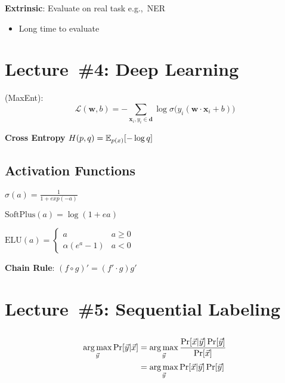 \documentclass[9pt]{extarticle}
\renewcommand{\green}[1]{{\color{ForestGreen} #1}}
\begin{document}
\begin{multicols}{3}
  \textbf{\green{Extrinsic}}: Evaluate on real task e.g.,~NER
  \begin{itemize}
    \item Long time to evaluate
  \end{itemize}

  \section*{Lecture~\#4: Deep Learning}
  \textbf{} (MaxEnt):
  \begin{equation*}\label{eq:L04:LogReg}
    \mathcal{L}(\mathbf{w},b) = -\sum_{\mathbf{x}_i,y_i \in \mathbf{d}} \log \sigma\big( y_i(\mathbf{w}\cdot \mathbf{x}_i + b) \big)
  \end{equation*}

  \textbf{\green{Cross Entropy}} $H(p,q) = \mathbb{E}_{p(x)} \lbrack-\log q\rbrack$

  \subsection*{Activation Functions}

  $\sigma(a) = \frac{1}{1+exp(-a)}$

  $\text{SoftPlus}(a) = \log(1 + e{a})$

  $\text{ELU}(a) = \begin{cases}
                      a & a \geq 0 \\
                      \alpha (e^{a} - 1) & a < 0
                   \end{cases}$

  \textbf{\green{Chain Rule}}: $(f \circ g)' = (f' \cdot g)g'$

  \section*{Lecture~\#5: Sequential Labeling}
  \subsection*{}

  \begin{align*}
    \operatorname*{arg\,max}_{\vec{y}} \Pr\lbrack\vec{y} \vert \vec{x}\rbrack &= \operatorname*{arg\,max}_{\vec{y}} \frac{\Pr\lbrack\vec{x} \vert \vec{y}\rbrack\Pr[\vec{y}]}{\Pr[\vec{x}]} \\
                                                        &= \operatorname*{arg\,max}_{\vec{y}} \Pr\lbrack\vec{x} \vert \vec{y}\rbrack \Pr[\vec{y}]
  \end{align*}


\end{multicols}
\end{document}
